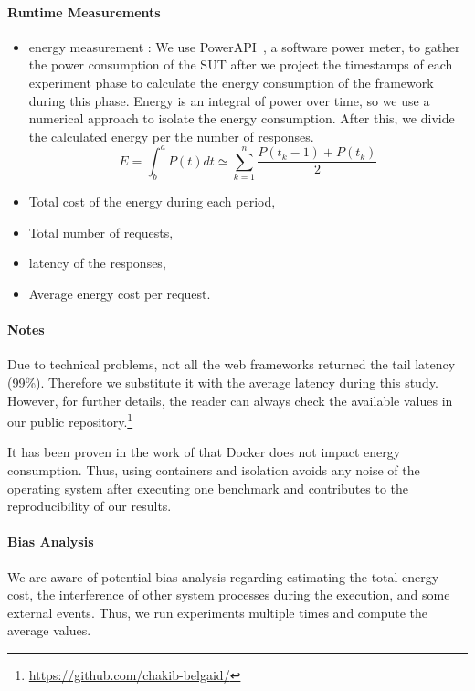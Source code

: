 \paragraph{Runtime Measurements}
\begin{itemize}
    \item energy measurement :
          We use PowerAPI~\cite{bourdon:hal-00772454}, a software power meter, to gather the power consumption of the SUT after we project the timestamps of each experiment phase to calculate the energy consumption of the framework during this phase.
          Energy is an integral of power over time, so we use a numerical approach to isolate the energy consumption.%
          After this, we divide the calculated energy per the number of responses.
          \begin{equation}
              E = \int^a_b P(t)dt \simeq \sum^n_{k=1} \frac{P(t_k-1)+P(t_k)}{2}
          \end{equation}
    \item Total cost of the energy during each period,
    \item Total number of requests,
    \item latency of the responses,
    \item Average energy cost per request.
\end{itemize}
\paragraph{Notes}
Due to technical problems, not all the web frameworks returned the tail latency (99\%). Therefore we substitute it with the average latency during this study.
However, for further details, the reader can always check the available values in our public repository.\footnote{\url{https://github.com/chakib-belgaid/}}


It has been proven in the work of \citeauthor{eddie_antonio_santos_how} that Docker does not impact energy consumption.
Thus, using containers and isolation avoids any noise of the operating system after executing one benchmark and contributes to the reproducibility of our results.

\paragraph{Bias Analysis}
We are aware of potential bias analysis regarding estimating the total energy cost, the interference of other system processes during the execution, and some external events.
Thus, we run experiments multiple times and compute the average values.

